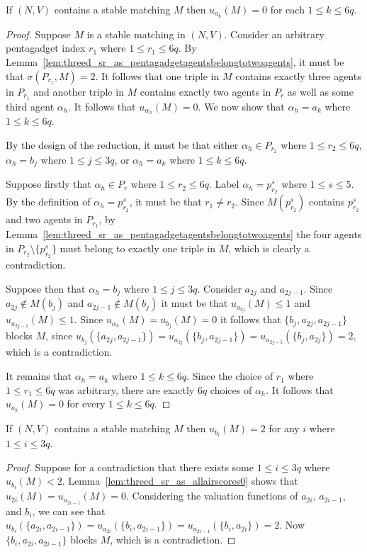\begin{lem}
\label{lem:threed_sr_as_allairscores0}
If $(N, V)$ contains a stable matching $M$ then $u_{a_k}(M)=0$ for each $1\leq k\leq 6q$.
\end{lem}
\begin{proof}
Suppose $M$ is a stable matching in $(N, V)$. Consider an arbitrary pentagadget index $r_1$ where $1 \leq {r_1} \leq 6q$. By Lemma~\ref{lem:threed_sr_as_pentagadgetagentsbelongtotwoagents}, it must be that $\sigma(P_{r_1}, M) = 2$. It follows that one triple in $M$ contains exactly three agents in $P_{r_1}$ and another triple in $M$ contains exactly two agents in $P_r$ as well as some third agent $\alpha_h$. It follows that $u_{\alpha_h}(M) = 0$. We now show that $\alpha_h = a_{k}$ where $1\leq k \leq 6q$.

By the design of the reduction, it must be that either $\alpha_h \in P_{r_2}$ where $1\leq r_2\leq 6q$, $\alpha_h = b_j$ where $1\leq j\leq 3q$, or $\alpha_h = a_k$ where $1\leq k\leq 6q$. 

Suppose firstly that ${\alpha_h} \in P_r$ where $1\leq r_2\leq 6q$. Label $\alpha_h = p_{r_2}^{s}$ where $1\leq s\leq 5$. By the definition of $\alpha_h = p_{r_2}^{s}$, it must be that ${r_1} \neq {r_2}$. Since $M(p_{r_2}^s)$ contains $p_{r_2}^s$ and two agents in $P_{r_1}$, by Lemma~\ref{lem:threed_sr_as_pentagadgetagentsbelongtotwoagents} the four agents in $P_{r_2} \setminus \{ p_{r_2}^s \}$ must belong to exactly one triple in $M$, which is clearly a contradiction.

Suppose then that ${\alpha_h} = b_j$ where $1 \leq j \leq 3q$. Consider $a_{2j}$ and $a_{2j-1}$. Since $a_{2j} \notin M(b_j)$ and $a_{2j-1} \notin M(b_j)$ it must be that $u_{a_{2j}}(M) \leq 1$ and $u_{a_{2j-1}}(M) \leq 1$. Since $u_{\alpha_h}(M) = u_{b_j}(M) = 0$ it follows that $\{ b_j, a_{2j}, a_{2j-1} \}$ blocks $M$, since $u_{b_j}(\{ a_{2j}, a_{2j-1} \}) = u_{a_{2j}}(\{b_j, a_{2j-1}\}) = u_{a_{2j-1}}(\{b_j, a_{2j}\}) = 2$, which is a contradiction.

It remains that ${\alpha_h} = a_k$ where $1 \leq k \leq 6q$. Since the choice of ${r_1}$ where $1\leq r_1 \leq 6q$ was arbitrary, there are exactly $6q$ choices of $\alpha_h$. It follows that $u_{a_k}(M) = 0$ for every $1 \leq k \leq 6q$.
\end{proof}

\begin{lem}
\label{lem:threed_sr_as_allbiscores2}
If $(N, V)$ contains a stable matching $M$ then $u_{b_i}(M)=2$ for any $i$ where $1 \leq i \leq 3q$.
\end{lem}
\begin{proof}
Suppose for a contradiction that there exists some $1 \leq i \leq 3q$ where $u_{b_i}(M) < 2$. Lemma~\ref{lem:threed_sr_as_allairscores0} shows that $u_{2i}(M) = u_{a_{2i-1}}(M) = 0$. Considering the valuation functions of $a_{2i}$, $a_{2i-1}$, and $b_i$, we can see that $u_{b_i}(\{ a_{2i}, a_{2i-1} \}) = u_{a_{2i}}(\{ b_i, a_{2i-1} \}) = u_{a_{2i-1}}(\{ b_i, a_{2i} \}) = 2$. Now $\{ b_i, a_{2i}, a_{2i-1} \}$ blocks $M$, which is a contradiction.
\end{proof}

